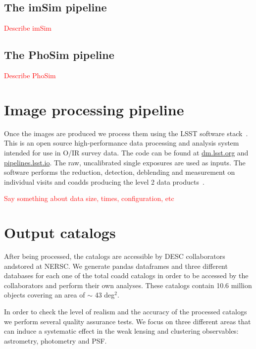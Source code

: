 \documentclass[\docopts]{\docclass}
\begin{document}
\subsection{The imSim pipeline}
\label{sec:imsim_pipeline}

\textcolor{red}{Describe imSim}

\subsection{The PhoSim pipeline}
\label{sec:phosim_pipeline}

\textcolor{red}{Describe PhoSim}

\section{Image processing pipeline}
\label{sec:image_processing_pipeline}

Once the images are produced we process them using the LSST software stack~\citep{2015arXiv151207914J}. This is an open
source high-performance data processing and analysis system intended for use in O/IR survey data. The code can be found at
\url{dm.lsst.org} and \url{pipelines.lsst.io}. The raw, uncalibrated single exposures are used as inputs. The software performs
the reduction, detection, deblending and measurement on individual visits and coadds producing the level 2 data
products~\citep{2015arXiv151207914J}.

\textcolor{red}{Say something about data size, times, configuration, etc}

\section{Output catalogs}
\label{sec:catalogs}

After being processed, the catalogs are accessible by DESC collaborators andstored at NERSC. We generate pandas
dataframes and three different databases for each one of the total coadd catalogs in order to be accessed by the
collaborators and perform their own analyses. These catalogs contain 10.6 million objects covering an area
of $\sim$ 43 deg$^{2}$.

In order to check the level of realism and the accuracy of the processed catalogs we perform several quality assurance tests.
We focus on three different areas that can induce a systematic effect in the weak lensing and clustering observables:
astrometry, photometry and PSF.
\end{document}

